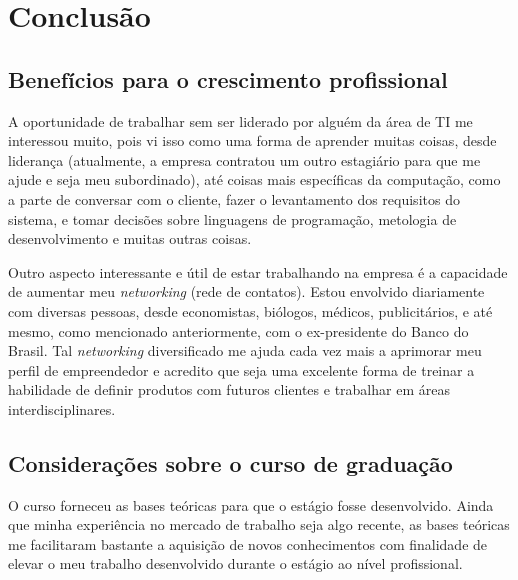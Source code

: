 \chapter{Conclusão}
\label{chap:conclusao}

\section{Benefícios para o crescimento profissional}

A oportunidade de trabalhar sem ser liderado por alguém da área de TI me interessou muito, pois vi isso como uma 
forma de aprender muitas coisas, desde liderança (atualmente, a empresa contratou um outro estagiário para que me
ajude e seja meu subordinado), até coisas mais específicas da computação, como a parte de conversar com o cliente,
fazer o levantamento dos requisitos do sistema, e tomar decisões sobre linguagens de programação, metologia de desenvolvimento
e muitas outras coisas.

Outro aspecto interessante e útil de estar trabalhando na empresa é a capacidade de aumentar meu \textit{networking} (rede de contatos).
Estou envolvido diariamente com diversas pessoas, desde economistas, biólogos, médicos, publicitários, e até mesmo, como mencionado
anteriormente, com o ex-presidente do Banco do Brasil. Tal \textit{networking} diversificado me ajuda cada vez mais a aprimorar 
meu perfil de empreendedor e acredito que seja uma excelente forma de treinar a habilidade de definir produtos com futuros clientes
e trabalhar em áreas interdisciplinares.




\section{Considerações sobre o curso de graduação}

O curso forneceu as bases teóricas para que o estágio fosse desenvolvido. Ainda que minha experiência no mercado de trabalho seja algo recente, 
as bases teóricas me facilitaram bastante a aquisição de novos conhecimentos com finalidade de elevar o meu trabalho desenvolvido 
durante o estágio ao nível profissional.


